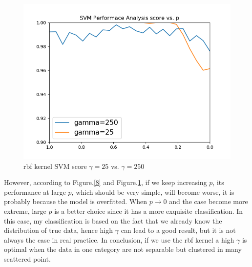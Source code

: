 \documentclass{article}
\begin{document}
\begin{figure}[H]
    \centering
    \includegraphics[scale=0.4]{svma3.png}
    \caption{rbf kernel SVM score $\gamma=25$ vs. $\gamma=250$}
    \label{svma3}
\end{figure}
However, according to Figure.\ref{8} and Figure.\ref{svma3}, if we keep increasing $p$, its performance at large $p$, which should be very simple, will become worse, it is probably because the model is overfitted. When $p\rightarrow0$ and the case become more extreme, large $p$ is a better choice since it has a more exquisite classification. In this case, my classification is based on the fact that we already know the distribution of true data, hence high $\gamma$ can lead to a good result, but it is not always the case in real practice. 
In conclusion, if we use the rbf kernel a high $\gamma$ is optimal when the data in one category are not separable but clustered in many scattered point. 
\end{document}
